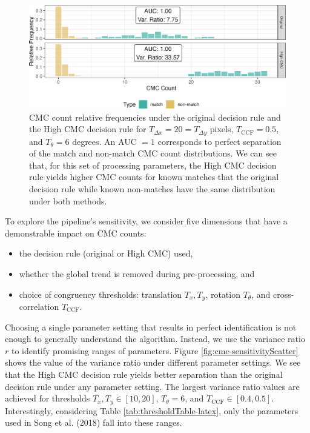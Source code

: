\begin{figure}[htbp]

{\centering \includegraphics[width=\textwidth]{figures/cmcDistributionExample} 

}

\caption{CMC count relative frequencies under the original decision rule and the High CMC decision rule for $T_{\Delta x} = 20 = T_{\Delta y}$ pixels, $T_{\text{CCF}} = 0.5$, and $T_{\theta} = 6$ degrees. An AUC $= 1$ corresponds to perfect separation of the match and non-match CMC count distributions. We can see that, for this set of processing parameters, the High CMC decision rule yields higher CMC counts for known matches that the original decision rule while known non-matches have the same distribution under both methods.}\label{fig:decisionRuleSensitivity-comparison}
\end{figure}

To explore the pipeline's sensitivity, we consider five dimensions that have a demonstrable impact on CMC counts:

\begin{itemize}
\item
  the decision rule (original or High CMC) used,
\item
  whether the global trend is removed during pre-processing, and
\item
  choice of congruency thresholds: translation \(T_x, T_y\), rotation \(T_\theta\), and cross-correlation \(T_{\text{CCF}}\).
\end{itemize}

Choosing a single parameter setting that results in perfect identification is not enough to generally understand the algorithm.
Instead, we use the variance ratio \(r\) to identify promising ranges of parameters.
Figure \ref{fig:cmc-sensitivityScatter} shows the value of the variance ratio under different parameter settings.
We see that the High CMC decision rule yields better separation than the original decision rule under any parameter setting.
The largest variance ratio values are achieved for thresholds \(T_x, T_y \in [10,20]\), \(T_\theta = 6\), and \(T_{\text{CCF}} \in [0.4,0.5]\).
Interestingly, considering Table \ref{tab:thresholdTable-latex}, only the parameters used in Song et al. (2018) fall into these ranges.

